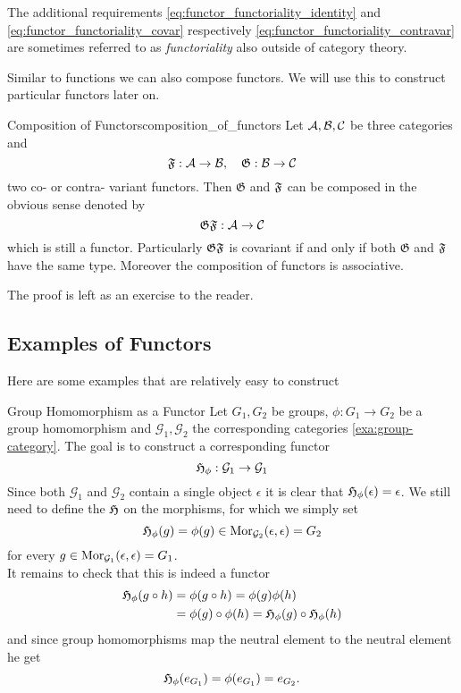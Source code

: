 The additional requirements \ref{eq:functor_functoriality_identity} and \ref{eq:functor_functoriality_covar} respectively \ref{eq:functor_functoriality_contravar} are sometimes referred to as \emph{functoriality} also outside of category theory.

Similar to functions we can also compose functors. We will use this to construct particular functors later on.

\begin{defprop}{Composition of Functors}{composition_of_functors}
Let $\mathcal{A}, \mathcal{B}, \mathcal{C}$ be three categories and
$$
\mathfrak{F}: \mathcal{A} \to \mathcal{B}, \quad \mathfrak{G}: \mathcal{B} \to \mathcal{C}
$$
two co- or contra- variant functors. Then $\mathfrak{G}$ and $\mathfrak{F}$ can be composed in the obvious sense denoted by
$$\mathfrak{G} \mathfrak{F}: \mathcal{A} \to \mathcal{C}$$
which is still a functor. Particularly $\mathfrak{G} \mathfrak{F}$ is covariant if and only if both $\mathfrak{G}$ and $\mathfrak{F}$ have the same type. Moreover the composition of functors is associative.
\end{defprop}
The proof is left as an exercise to the reader.

\subsection{Examples of Functors}
Here are some examples that are relatively easy to construct
\begin{example}{Group Homomorphism as a Functor}{}
Let $G_1, G_2$ be groups, $\phi: G_1 \to G_2$ be a group homomorphism and $\mathcal{G}_1,\mathcal{G}_2$ the corresponding categories \ref{exa:group-category}. The goal is to construct a corresponding functor 
$$
\mathfrak{H}_\phi: \mathcal{G}_1 \to \mathcal{G}_1
$$
Since both $\mathcal{G}_1$ and $\mathcal{G}_2$ contain a single object $\epsilon$ it is clear that $\mathfrak{H}_\phi(\epsilon) = \epsilon$. We still need to define the $\mathfrak{H}$ on the morphisms, for which we simply set
$$
\mathfrak{H}_\phi(g) = \phi(g) \in \mathrm {Mor}_{\mathcal{G}_2}(\epsilon, \epsilon) = G_2
$$
for every $g \in \mathrm {Mor}_{\mathcal{G}_1}(\epsilon, \epsilon) = G_1$. \\

It remains to check that this is indeed a functor
\begin{equation*}
\begin{split}
\mathfrak{H}_\phi(g \circ h) &= \phi(g \circ h) = \phi(g)\phi(h) \\
&= \phi(g) \circ \phi(h) = \mathfrak{H}_\phi(g) \circ \mathfrak{H}_\phi(h)
\end{split}
\end{equation*}
and since group homomorphisms map the neutral element to the neutral element he get
\begin{equation*}
\mathfrak{H}_\phi(e_{G_1}) = \phi(e_{G_1}) = e_{G_2}.
\end{equation*}
\end{example}

